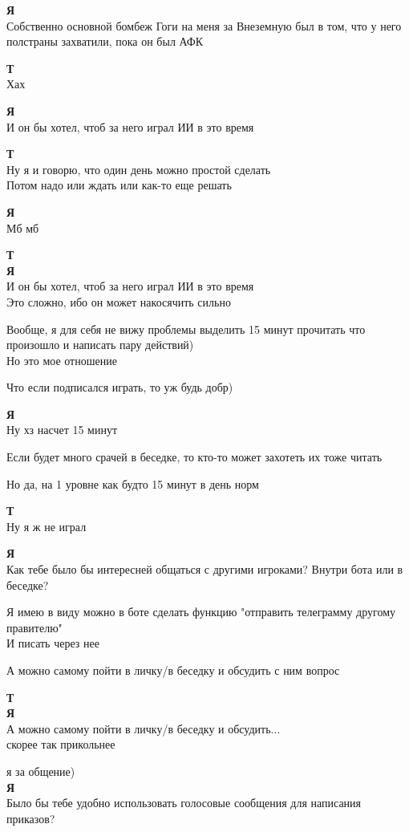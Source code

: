 \begin{tabbing}
\textbf{Я} \\
Собственно основной бомбеж Гоги на меня за Внеземную был в том, что у него полстраны захватили, пока он был АФК

\textbf{Т} \\
Хах

\textbf{Я} \\
И он бы хотел, чтоб за него играл ИИ в это время

\textbf{Т} \\
Ну я и говорю, что один день можно простой сделать \\
Потом надо или ждать или как-то еще решать

\textbf{Я} \\
Мб мб

\textbf{Т} \\
\textbf{Я} \\
И он бы хотел, чтоб за него играл ИИ в это время \\
Это сложно, ибо он может накосячить сильно

Вообще, я для себя не вижу проблемы выделить 15 минут прочитать что произошло и написать пару действий)\\
Но это мое отношение

Что если подписался играть, то уж будь добр)

\textbf{Я} \\
Ну хз насчет 15 минут

Если будет много срачей в беседке, то кто-то может захотеть их тоже читать

Но да, на 1 уровне как будто 15 минут в день норм

\textbf{Т} \\
Ну я ж не играл

\textbf{Я} \\
Как тебе было бы интересней общаться с другими игроками? Внутри бота или в беседке?

Я имею в виду можно в боте сделать функцию "отправить телеграмму другому правителю" \\
И писать через нее

А можно самому пойти в личку/в беседку и обсудить с ним вопрос

\textbf{Т} \\
\textbf{Я} \\
А можно самому пойти в личку/в беседку и обсудить... \\
скорее так прикольнее

я за общение)\\
\textbf{Я} \\
Было бы тебе удобно использовать голосовые сообщения для написания приказов?


\end{tabbing}

